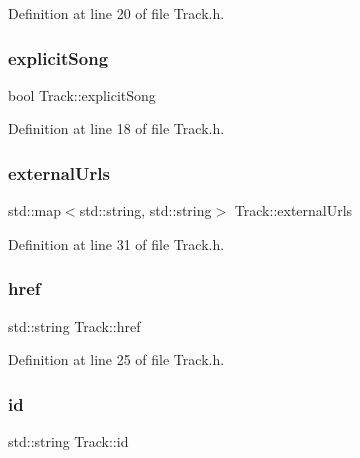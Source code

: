 Definition at line 20 of file Track.\+h.

\mbox{\label{class_track_a4ab310f40214ce50f8ddc119f533a360}} 
\subsubsection{\texorpdfstring{explicit\+Song}{explicitSong}}
{\footnotesize\ttfamily bool Track\+::explicit\+Song\hspace{0.3cm}{\ttfamily [private]}}



Definition at line 18 of file Track.\+h.

\mbox{\label{class_track_ac654eea298e20bc0a85f33dc62ef5313}} 
\subsubsection{\texorpdfstring{external\+Urls}{externalUrls}}
{\footnotesize\ttfamily std\+::map$<$std\+::string, std\+::string$>$ Track\+::external\+Urls\hspace{0.3cm}{\ttfamily [private]}}



Definition at line 31 of file Track.\+h.

\mbox{\label{class_track_a20872bbafa6e5cde75ee793c0dd80afb}} 
\subsubsection{\texorpdfstring{href}{href}}
{\footnotesize\ttfamily std\+::string Track\+::href\hspace{0.3cm}{\ttfamily [private]}}



Definition at line 25 of file Track.\+h.

\mbox{\label{class_track_aa71bccc3071caa1c2440ad260d55e152}} 
\subsubsection{\texorpdfstring{id}{id}}
{\footnotesize\ttfamily std\+::string Track\+::id\hspace{0.3cm}{\ttfamily [private]}}



